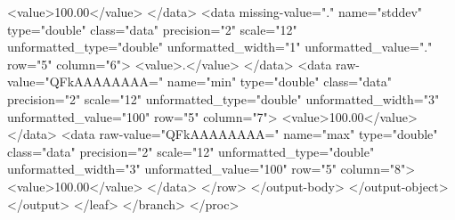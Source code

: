 <value>100.00</value>
</data>
<data missing-value="." name="stddev" type="double" class="data" precision="2" scale="12" unformatted_type="double" unformatted_width="1" unformatted_value="." row="5" column="6">
<value>.</value>
</data>
<data raw-value="QFkAAAAAAAA=" name="min" type="double" class="data" precision="2" scale="12" unformatted_type="double" unformatted_width="3" unformatted_value="100" row="5" column="7">
<value>100.00</value>
</data>
<data raw-value="QFkAAAAAAAA=" name="max" type="double" class="data" precision="2" scale="12" unformatted_type="double" unformatted_width="3" unformatted_value="100" row="5" column="8">
<value>100.00</value>
</data>
</row>
</output-body>
</output-object>
</output>
</leaf>
</branch>
</proc>
